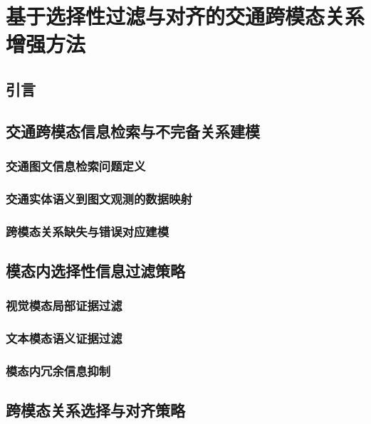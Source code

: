 
\chapter{基于选择性过滤与对齐的交通跨模态关系增强方法}

\section{引言}

\section{交通跨模态信息检索与不完备关系建模}

\subsection{交通图文信息检索问题定义}

\subsection{交通实体语义到图文观测的数据映射}

\subsection{跨模态关系缺失与错误对应建模}

\section{模态内选择性信息过滤策略}

\subsection{视觉模态局部证据过滤}

\subsection{文本模态语义证据过滤}

\subsection{模态内冗余信息抑制}

\section{跨模态关系选择与对齐策略}

